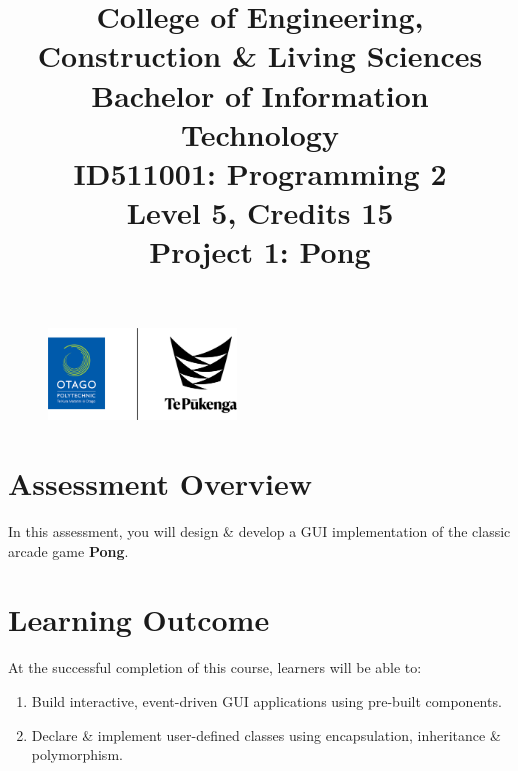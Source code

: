 \documentclass{article}
\author{}
\begin{document}
\begin{figure}
    \centering
    \includegraphics[width=50mm]{../../resources/img/logo.png}
\end{figure}

\title{College of Engineering, Construction \& Living Sciences\\Bachelor of Information Technology\\ID511001: Programming 2\\Level 5, Credits 15\\\textbf{Project 1: Pong}}
\date{}
\maketitle

\section*{Assessment Overview}
In this assessment, you will design \& develop a GUI implementation of the classic arcade game \textbf{Pong}.

\section*{Learning Outcome}
At the successful completion of this course, learners will be able to:
\begin{enumerate}
    \item Build interactive, event-driven GUI applications using pre-built components.
    \item Declare \& implement user-defined classes using encapsulation, inheritance \& polymorphism.
\end{enumerate}
\end{document}
